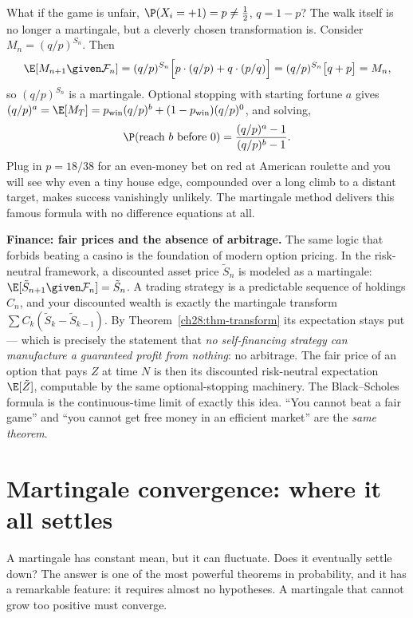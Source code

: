 \begin{example}
\label{ch28:ex-biased}
What if the game is unfair, $\P(X_i = +1) = p \ne \tfrac12$, $q = 1-p$? The walk itself is no longer a
martingale, but a cleverly chosen transformation is. Consider $M_n = (q/p)^{S_n}$. Then
\[
  \E[M_{n+1}\given\mathcal{F}_n] = (q/p)^{S_n}\Big[p\cdot(q/p) + q\cdot(p/q)\Big]
  = (q/p)^{S_n}\big[q + p\big] = M_n,
\]
so $(q/p)^{S_n}$ is a martingale. Optional stopping with starting fortune $a$ gives
$(q/p)^a = \E[M_T] = p_{\text{win}}(q/p)^b + (1-p_{\text{win}})(q/p)^0$, and solving,
\[
  \P(\text{reach } b \text{ before } 0) = \frac{(q/p)^a - 1}{(q/p)^b - 1}.
\]
Plug in $p = 18/38$ for an even-money bet on red at American roulette and you will see why even a tiny
house edge, compounded over a long climb to a distant target, makes success vanishingly unlikely. The
martingale method delivers this famous formula with no difference equations at all.
\end{example}

\begin{applicationbox}
\textbf{Finance: fair prices and the absence of arbitrage.} The same logic that forbids beating a
casino is the foundation of modern option pricing. In the risk-neutral framework, a discounted asset
price $\tilde{S}_n$ is modeled as a martingale: $\E[\tilde{S}_{n+1}\given\mathcal{F}_n] =
\tilde{S}_n$. A trading strategy is a predictable sequence of holdings $C_n$, and your discounted
wealth is exactly the martingale transform $\sum C_k(\tilde{S}_k - \tilde{S}_{k-1})$. By
Theorem~\ref{ch28:thm-transform} its expectation stays put --- which is precisely the statement that
\emph{no self-financing strategy can manufacture a guaranteed profit from nothing}: no arbitrage. The
fair price of an option that pays $Z$ at time $N$ is then its discounted risk-neutral expectation
$\E[\tilde{Z}]$, computable by the same optional-stopping machinery. The Black--Scholes formula is the
continuous-time limit of exactly this idea. ``You cannot beat a fair game'' and ``you cannot get free
money in an efficient market'' are the \emph{same theorem}.
\end{applicationbox}

\section{Martingale convergence: where it all settles}
\label{ch28:convergence}

A martingale has constant mean, but it can fluctuate. Does it eventually settle down? The answer is one
of the most powerful theorems in probability, and it has a remarkable feature: it requires almost no
hypotheses. A martingale that cannot grow too positive must converge.

